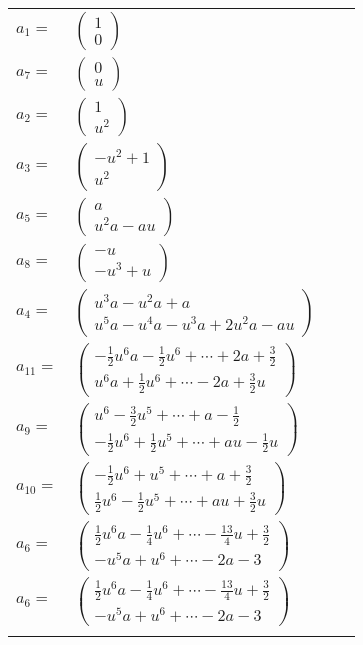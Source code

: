 \documentclass[1p]{elsarticle_modified}
\theoremstyle{definition}
\begin{document}
\begin{tabular}{m{7pt} m{180pt} m{7pt} m{180pt} }
\flushright $a_{1}=$&$\begin{pmatrix}1\\0\end{pmatrix}$ \\
\flushright $a_{7}=$&$\begin{pmatrix}0\\u\end{pmatrix}$ \\
\flushright $a_{2}=$&$\begin{pmatrix}1\\u^2\end{pmatrix}$ \\
\flushright $a_{3}=$&$\begin{pmatrix}- u^2+1\\u^2\end{pmatrix}$ \\
\flushright $a_{5}=$&$\begin{pmatrix}a\\u^2 a- a u\end{pmatrix}$ \\
\flushright $a_{8}=$&$\begin{pmatrix}- u\\- u^3+u\end{pmatrix}$ \\
\flushright $a_{4}=$&$\begin{pmatrix}u^3 a- u^2 a+a\\u^5 a- u^4 a- u^3 a+2 u^2 a- a u\end{pmatrix}$ \\
\flushright $a_{11}=$&$\begin{pmatrix}-\frac{1}{2} u^6 a-\frac{1}{2} u^6+\cdots+2 a+\frac{3}{2}\\u^6 a+\frac{1}{2} u^6+\cdots-2 a+\frac{3}{2} u\end{pmatrix}$ \\
\flushright $a_{9}=$&$\begin{pmatrix}u^6-\frac{3}{2} u^5+\cdots+a-\frac{1}{2}\\-\frac{1}{2} u^6+\frac{1}{2} u^5+\cdots+a u-\frac{1}{2} u\end{pmatrix}$ \\
\flushright $a_{10}=$&$\begin{pmatrix}-\frac{1}{2} u^6+u^5+\cdots+a+\frac{3}{2}\\\frac{1}{2} u^6-\frac{1}{2} u^5+\cdots+a u+\frac{3}{2} u\end{pmatrix}$ \\
\flushright $a_{6}=$&$\begin{pmatrix}\frac{1}{2} u^6 a-\frac{1}{4} u^6+\cdots-\frac{13}{4} u+\frac{3}{2}\\- u^5 a+u^6+\cdots-2 a-3\end{pmatrix}$\\ \flushright $a_{6}=$&$\begin{pmatrix}\frac{1}{2} u^6 a-\frac{1}{4} u^6+\cdots-\frac{13}{4} u+\frac{3}{2}\\- u^5 a+u^6+\cdots-2 a-3\end{pmatrix}$\\&\end{tabular}
\end{document}

